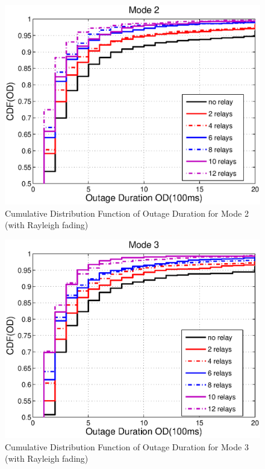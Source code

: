 \begin{figure}
\centering
\includegraphics[width=12cm]{OutageDuration_Rayleigh_Mode2_V2.eps}
\caption{Cumulative Distribution Function of Outage Duration for Mode 2 (with Rayleigh fading)}
\label{2:Mode2Out}
\end{figure}
\begin{figure}
\centering
\includegraphics[width=12cm]{OutageDuration_Rayleigh_Mode3_V2.eps}
\caption{Cumulative Distribution Function of Outage Duration for Mode 3 (with Rayleigh fading)}
\label{2:Mode3Out}
\end{figure}

